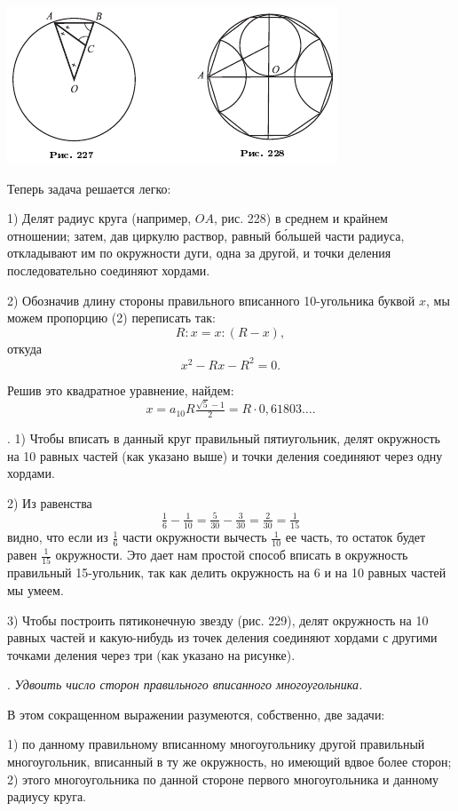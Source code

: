 \documentclass[oneside]{book}
\begin{document}
\includegraphics{pics/ris-227-228}


Теперь задача решается легко:

1) Делят радиус круга (например, $OA$, рис. 228) в среднем и крайнем отношении;
затем, дав циркулю раствор, равный б\'{о}льшей части радиуса, откладывают им по окружности дуги, одна за другой, и точки деления последовательно соединяют хордами.

2) Обозначив длину стороны правильного вписанного 10-угольника буквой $x$, мы можем пропорцию (2) переписать так:
\[R:x=x:(R-x),\]
откуда
\[x^2-Rx-R^2=0.\]

Решив это квадратное уравнение, найдем:
\[x=a_{10}R\tfrac{\sqrt5-1}{2}=R \cdot  0,61803\dots.\]

.
1) Чтобы вписать в данный круг правильный пятиугольник, делят окружность на 10 равных частей (как указано выше) и точки деления соединяют через одну хордами.

2) Из равенства
\[\tfrac16-\tfrac1{10}=\tfrac5{30}-\tfrac3{30}=\tfrac2{30}=\tfrac1{15}\]
видно, что если из $\tfrac16$ части окружности вычесть $\tfrac1{10}$ ее часть, то остаток будет равен $\tfrac1{15}$ окружности.
Это дает нам простой способ вписать в окружность правильный 15-угольник, так как делить окружность на 6 и на 10 равных частей мы умеем.

3) Чтобы построить пятиконечную звезду (рис. 229), делят окружность на 10 равных частей и какую-нибудь из точек деления соединяют хордами с другими точками деления через три (как указано на рисунке).

.
\emph{Удвоить число сторон правильного вписанного многоугольника.}

В этом сокращенном выражении разумеются, %
собственно, две задачи:

1) по данному правильному вписанному многоугольнику  другой правильный многоугольник, вписанный в ту же окружность, но имеющий вдвое более сторон;
2)  этого многоугольника по данной стороне первого многоугольника и данному радиусу круга.
\end{document}
